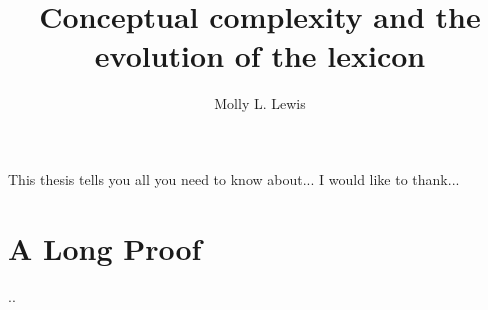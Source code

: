 \documentclass[12pt]{report}
\begin{document}
\title{Conceptual complexity and the evolution of the lexicon}
\author{Molly L. Lewis}
 
\beforepreface 
{}
This thesis tells you all you need to know about...
I would like to thank...

\afterpreface

\cite{haspelmath2005world}







\appendix
\chapter{A Long Proof}
..


\end{document}

